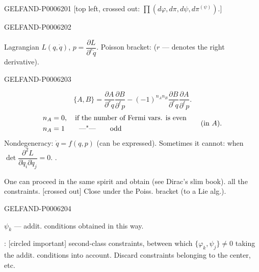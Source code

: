 \begin{GelfandAdjacentEvidence}{GELFAND-P000620}{1}
[top left, crossed out:
\(\prod(d\varphi,d\pi,d\psi,d\pi^{(\psi)})\).]
\end{GelfandAdjacentEvidence}
\begin{GelfandAdjacentEvidence}{GELFAND-P000620}{2}


Lagrangian \(L(q,\dot q)\), \(p=\dfrac{\partial L}{\partial^r\dot q}\).
Poisson bracket: (\(r\) — denotes the right derivative).
\end{GelfandAdjacentEvidence}
\begin{GelfandAdjacentEvidence}{GELFAND-P000620}{3}

\[
\{A,B\}=\frac{\partial A}{\partial^r q}\frac{\partial B}{\partial^\ell p}
-(-1)^{n_A n_B}\frac{\partial B}{\partial^r q}\frac{\partial A}{\partial^\ell p}.
\]
\[
\begin{aligned}
n_A&=0,\quad\text{if the number of Fermi vars. is even}\\
n_A&=1\qquad\text{—\textquotedbl—}\qquad\text{odd}
\end{aligned}
\qquad\text{(in \(A\)).}
\]
Nondegeneracy: \(\dot q=f(q,p)\) (can be expressed).
Sometimes it cannot: when
\(\det\dfrac{\partial^2 L}{\partial\dot q_i\partial\dot q_j}=0\).
.

One can proceed in the same spirit and obtain (see Dirac’s slim book).
all the constraints. [crossed out] Close under the Poiss. bracket (to a Lie alg.).
\end{GelfandAdjacentEvidence}
\begin{GelfandAdjacentEvidence}{GELFAND-P000620}{4}

\(\psi_k\) — addit. conditions obtained in this way.

: [circled important] second-class constraints, between which
\(\{\varphi_k,\psi_j\}\ne0\) taking the addit. conditions into account.
Discard constraints belonging to the center, etc.
\end{GelfandAdjacentEvidence}
